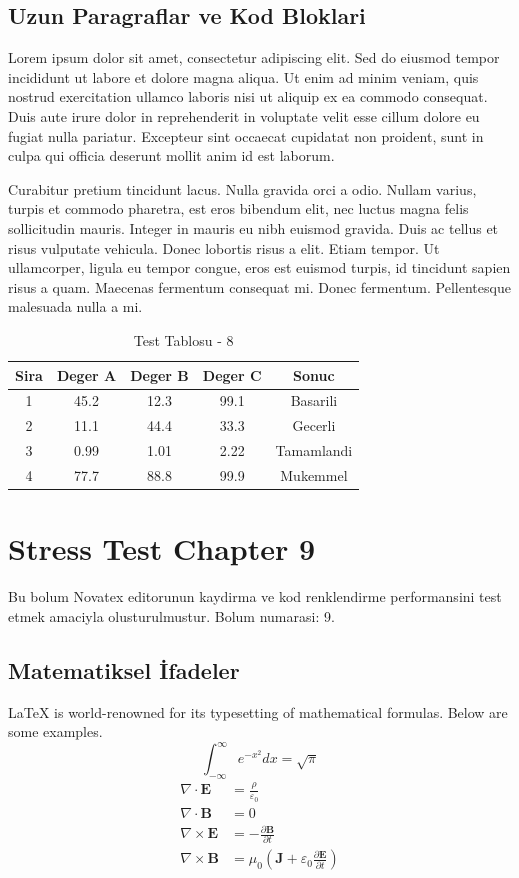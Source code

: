\documentclass[12pt,a4paper]{article}
\begin{document}
\subsection{Uzun Paragraflar ve Kod Bloklari}
Lorem ipsum dolor sit amet, consectetur adipiscing elit. Sed do eiusmod tempor incididunt ut labore et dolore magna aliqua. Ut enim ad minim veniam, quis nostrud exercitation ullamco laboris nisi ut aliquip ex ea commodo consequat. Duis aute irure dolor in reprehenderit in voluptate velit esse cillum dolore eu fugiat nulla pariatur. Excepteur sint occaecat cupidatat non proident, sunt in culpa qui officia deserunt mollit anim id est laborum.

Curabitur pretium tincidunt lacus. Nulla gravida orci a odio. Nullam varius, turpis et commodo pharetra, est eros bibendum elit, nec luctus magna felis sollicitudin mauris. Integer in mauris eu nibh euismod gravida. Duis ac tellus et risus vulputate vehicula. Donec lobortis risus a elit. Etiam tempor. Ut ullamcorper, ligula eu tempor congue, eros est euismod turpis, id tincidunt sapien risus a quam. Maecenas fermentum consequat mi. Donec fermentum. Pellentesque malesuada nulla a mi.

\begin{table}[h!]
\centering
\begin{tabular}{|c|c|c|c|c|}
\hline
\textbf{Sira} & \textbf{Deger A} & \textbf{Deger B} & \textbf{Deger C} & \textbf{Sonuc} \\
\hline
1 & 45.2 & 12.3 & 99.1 & Basarili \\
2 & 11.1 & 44.4 & 33.3 & Gecerli \\
3 & 0.99 & 1.01 & 2.22 & Tamamlandi \\
4 & 77.7 & 88.8 & 99.9 & Mukemmel \\
\hline
\end{tabular}
\caption{Test Tablosu - 8}
\end{table}

\newpage
\section{Stress Test Chapter 9}
Bu bolum Novatex editorunun kaydirma ve kod renklendirme performansini test etmek amaciyla olusturulmustur. Bolum numarasi: 9.

\subsection{Matematiksel İfadeler}
\LaTeX{} is world-renowned for its typesetting of mathematical formulas. Below are some examples.
\begin{equation}
\int_{-\infty}^{\infty} e^{-x^2} dx = \sqrt{\pi}
\end{equation}
\begin{align}
\nabla \cdot \mathbf{E} &= \frac{\rho}{\varepsilon_0} \\
\nabla \cdot \mathbf{B} &= 0 \\
\nabla \times \mathbf{E} &= -\frac{\partial \mathbf{B}}{\partial t} \\
\nabla \times \mathbf{B} &= \mu_0\left(\mathbf{J} + \varepsilon_0 \frac{\partial \mathbf{E}}{\partial t}\right)
\end{align}
\end{document}
